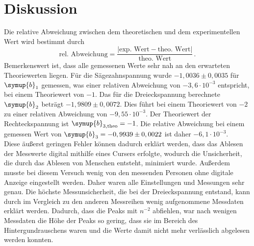 \section{Diskussion}
\label{sec:Diskussion}
Die relative Abweichung zwischen dem theoretischen und dem experimentellen Wert wird bestimmt durch
$$\text{rel. Abweichung} = \frac{|\text{exp. Wert} - \text{theo. Wert}|}{\text{theo. Wert}}\,.$$
Bemerkenswert ist, dass alle gemessenen Werte sehr nah an den erwarteten Theoriewerten liegen. 
Für die Sägezahnspannung wurde $- 1,0036 \pm 0,0035$ für $\symup{b}_1$ gemessen, was einer relativen Abweichung von $- 3,6 \cdot 10^{-3}$ entspricht, bei einem Theoriewert 
von $- 1$. Das für die Dreieckspannung berechnete $\symup{b}_2$ beträgt $- 1,9809 \pm 0,0072$. Dies führt bei einem Theoriewert von $- 2$ zu einer relativen Abweichung von 
$- 9,55 \cdot 10^{-3}$. Der Theoriewert der Rechteckspannung ist $\symup{b}_{3,\text{theo}} = - 1$. Die relative Abweichung bei einem gemessen Wert von 
$\symup{b}_3 = - 0,9939 \pm 0,0022$ ist daher $- 6,1 \cdot 10^{-3}$. \\
Diese äußerst geringen Fehler können dadurch erklärt werden, dass das Ablesen der Messwerte digital mithilfe eines Cursers erfolgte, wodurch die Unsicherheit, 
die durch das Ablesen von Menschen entsteht, minimiert wurde. Außerdem musste bei diesem Versuch wenig von den messenden Personen ohne digitale Anzeige eingestellt
werden. Daher waren alle Einstellungen und Messungen sehr genau. Die höchste Messunsicherheit, die bei der Dreieckspannung entstand, kann durch 
im Vergleich zu den anderen Messreihen wenig aufgenommene Messdaten erklärt werden. Dadurch, dass die Peaks mit $n^{-2}$ abfiehlen, war nach wenigen Messdaten 
die Höhe der Peaks so gering, dass sie im Bereich des Hintergundrauschens waren und die Werte damit nicht mehr verlässlich abgelesen werden konnten.  
